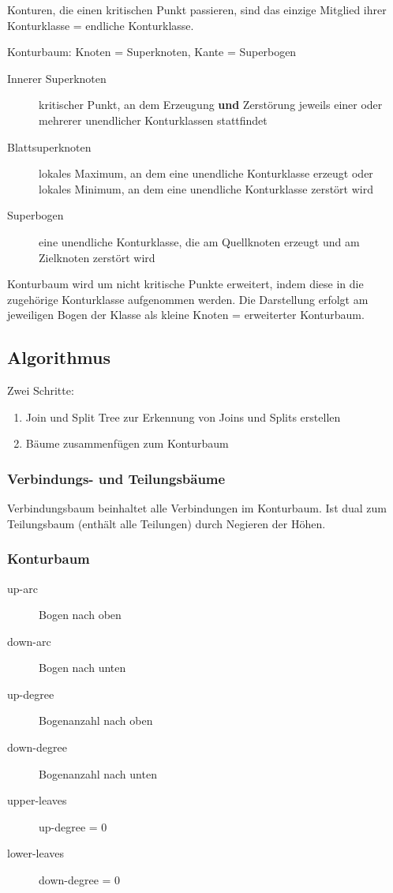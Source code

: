 Konturen, die einen kritischen Punkt passieren, sind das einzige Mitglied ihrer Konturklasse = endliche Konturklasse.

Konturbaum: Knoten = Superknoten, Kante = Superbogen
\begin{description}
	\item[Innerer Superknoten] kritischer Punkt, an dem Erzeugung \textbf{und} Zerstörung jeweils einer oder mehrerer unendlicher Konturklassen stattfindet
	\item[Blattsuperknoten] lokales Maximum, an dem eine unendliche Konturklasse erzeugt oder lokales Minimum, an dem eine unendliche Konturklasse zerstört wird
	\item[Superbogen] eine unendliche Konturklasse, die am Quellknoten erzeugt und am Zielknoten zerstört wird
\end{description}

Konturbaum wird um nicht kritische Punkte erweitert, indem diese in die zugehörige Konturklasse aufgenommen werden. Die Darstellung erfolgt am jeweiligen Bogen der Klasse als kleine Knoten = erweiterter Konturbaum.

\subsection{Algorithmus}
Zwei Schritte:
\begin{enumerate}
	\item Join und Split Tree zur Erkennung von Joins und Splits erstellen
	\item Bäume zusammenfügen zum Konturbaum
\end{enumerate}

\subsubsection{Verbindungs- und Teilungsbäume}
Verbindungsbaum beinhaltet alle Verbindungen im Konturbaum. Ist dual zum Teilungsbaum (enthält alle Teilungen) durch Negieren der Höhen.

\subsubsection{Konturbaum}
\begin{description}
	\item[up-arc] Bogen nach oben
	\item[down-arc] Bogen nach unten
	\item[up-degree] Bogenanzahl nach oben
	\item[down-degree] Bogenanzahl nach unten
	\item[upper-leaves] up-degree = 0
	\item[lower-leaves] down-degree = 0
\end{description}

